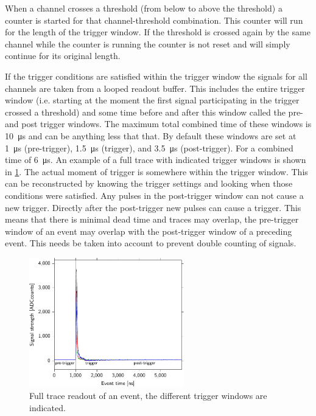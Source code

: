 When a channel crosses a threshold (from below to above the threshold) a counter is started for that channel-threshold combination. This counter will run for the length of the trigger window. If the threshold is crossed again by the same channel while the counter is running the counter is not reset and will simply continue for its original length.

If the trigger conditions are satisfied within the trigger window the \pmt signals for all channels are taken from a looped readout buffer. This includes the entire trigger window (i.e. starting at the moment the first signal participating in the trigger crossed a threshold) and some time before and after this window called the pre- and post trigger windows. The maximum total combined time of these windows is \SI{10}{\micro\second} and can be anything less that that. By default these windows are set at \SI{1}{\micro\second} (pre-trigger), \SI{1.5}{\micro\second} (trigger), and \SI{3.5}{\micro\second} (post-trigger). For a combined time of \SI{6}{\micro\second}. An example of a full trace with indicated trigger windows is shown in \cref{fig:trigger_windows}. The actual moment of trigger is somewhere within the trigger window. This can be reconstructed by knowing the trigger settings and looking when those conditions were satisfied. Any pulses in the post-trigger window can not cause a new trigger. Directly after the post-trigger new pulses can cause a trigger. This means that there is minimal dead time and traces may overlap, the pre-trigger window of an event may overlap with the post-trigger window of a preceding event. This needs be taken into account to prevent double counting of signals.

\begin{figure}
    \centering
    \includegraphics[width=0.6\textwidth]
                    {plots/station/trace_501_1443743701_102112574}
    \caption{Full trace readout of an event, the different trigger windows are indicated.}
    \label{fig:trigger_windows}
\end{figure}

